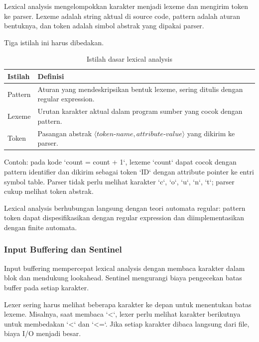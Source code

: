 \begin{jawab}
Lexical analysis mengelompokkan karakter menjadi lexeme dan mengirim token ke parser. Lexeme adalah string aktual di source code, pattern adalah aturan bentuknya, dan token adalah simbol abstrak yang dipakai parser.
\end{jawab}

Tiga istilah ini harus dibedakan.

\begin{table}[H]
\centering
\begin{tabularx}{\textwidth}{|L{0.20\textwidth}|X|}
\hline
\textbf{Istilah} & \textbf{Definisi} \\
\hline
Pattern & Aturan yang mendeskripsikan bentuk lexeme, sering ditulis dengan regular expression. \\
\hline
Lexeme & Urutan karakter aktual dalam program sumber yang cocok dengan pattern. \\
\hline
Token & Pasangan abstrak $\langle token\text{-}name, attribute\text{-}value\rangle$ yang dikirim ke parser. \\
\hline
\end{tabularx}
\caption{Istilah dasar lexical analysis}
\label{tab:lexeme-pattern-token}
\end{table}

Contoh: pada kode `count = count + 1`, lexeme `count` dapat cocok dengan pattern identifier dan dikirim sebagai token `ID` dengan attribute pointer ke entri symbol table. Parser tidak perlu melihat karakter `c`, `o`, `u`, `n`, `t`; parser cukup melihat token abstrak.

Lexical analysis berhubungan langsung dengan teori automata regular: pattern token dapat dispesifikasikan dengan regular expression dan diimplementasikan dengan finite automata.

\subsubsection{Input Buffering dan Sentinel}

\begin{jawab}
Input buffering mempercepat lexical analysis dengan membaca karakter dalam blok dan mendukung lookahead. Sentinel mengurangi biaya pengecekan batas buffer pada setiap karakter.
\end{jawab}

Lexer sering harus melihat beberapa karakter ke depan untuk menentukan batas lexeme. Misalnya, saat membaca `<`, lexer perlu melihat karakter berikutnya untuk membedakan `<` dan `<=`. Jika setiap karakter dibaca langsung dari file, biaya I/O menjadi besar.

